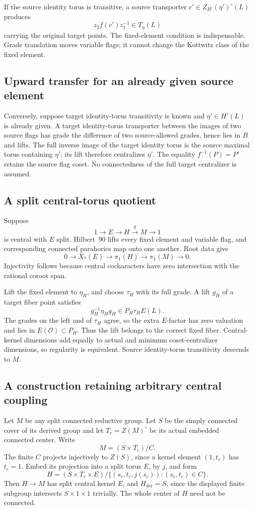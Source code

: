 \documentclass[11pt,a4paper]{article}
\theoremstyle{definition}
\theoremstyle{remark}
\begin{document}
If the source identity torus is transitive, a source transporter
\(c'\in Z_{H'}(\eta')^\circ(L)\) produces
\[
z_2f(c')z_1^{-1}\in T_\eta(L)
\]
carrying the original target points. The fixed-element condition
is indispensable. Grade translation moves variable flags; it
cannot change the Kottwitz class of the fixed element.

\subsection{Upward transfer for an already given source element}
Conversely, suppose target identity-torus transitivity is known and
\(\eta'\in H'(L)\) is already given. A target identity-torus
transporter between the images of two source flags has grade the
difference of two source-allowed grades, hence lies in \(B\) and
lifts. The full inverse image of the target identity torus is the
source maximal torus containing \(\eta'\); its lift therefore
centralizes \(\eta'\). The equality \(f^{-1}(P)=P'\) retains the
source flag coset. No connectedness of the full target centralizer
is assumed.

\subsection{A split central-torus quotient}
Suppose
\[
1\longrightarrow E\longrightarrow H
\overset q\longrightarrow M\longrightarrow1
\]
is central with \(E\) split. Hilbert~90 lifts every fixed element and
variable flag, and corresponding connected parahorics map onto one
another. Root data give
\[
0\longrightarrow X_*(E)\longrightarrow\pi_1(H)
\longrightarrow\pi_1(M)\longrightarrow0.
\]
Injectivity follows because central cocharacters have zero intersection
with the rational coroot span.

Lift the fixed element to \(\eta_H\), and choose \(\tau_H\) with its
full grade. A lift \(g_H\) of a target fiber point satisfies
\[
g_H^{-1}\eta_Hg_H\in P_H\dot\tau_HE(L).
\]
The grades on the left and of \(\tau_H\) agree, so the extra \(E\)-factor
has zero valuation and lies in \(E(\mathcal O)\subset P_H\). Thus the
lift belongs to the correct fixed fiber. Central-kernel dimensions
add equally to actual and minimum coset-centralizer dimensions, so
regularity is equivalent. Source identity-torus transitivity descends
to \(M\).

\subsection{A construction retaining arbitrary central coupling}
Let \(M\) be any split connected reductive group. Let \(S\) be the
simply connected cover of its derived group and let
\(T_c=Z(M)^\circ\) be its actual embedded connected center. Write
\[
M=(S\times T_c)/C.
\]
The finite \(C\) projects injectively to \(Z(S)\), since a kernel
element \((1,t_c)\) has \(t_c=1\). Embed its projection into a split
torus \(E\), by \(j\), and form
\[
H=(S\times T_c\times E)/
\{(s_c,t_c,j(s_c)):(s_c,t_c)\in C\}.
\]
Then \(H\to M\) has split central kernel \(E\), and
\(H_{\mathrm{der}}=S\), since the displayed finite subgroup intersects
\(S\times1\times1\) trivially. The whole center of \(H\) need not be
connected.
\end{document}
